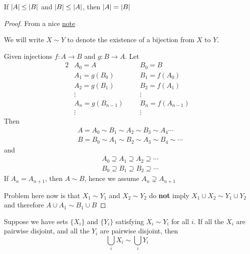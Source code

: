 \documentclass[11pt]{article}
\begin{document}
\begin{theorem}
\label{thm3.2}
If \(\abs{A}\le\abs{B}\) and \(\abs{B}\le\abs{A}\), then \(\abs{A}=\abs{B}\)
\end{theorem}

\begin{proof}
From a nice \href{https://web.williams.edu/Mathematics/lg5/CanBer.pdf}{note}

We will write \(X\sim Y\) to denote the existence of a bijection from \(X\) to \(Y\).

Given injections \(f:A\to B\) and \(g:B\to A\). Let
\begin{alignat*}{2}
&A_0=A\hspace{2cm}&&B_0=B\\
&A_1=g(B_0)&&B_1=f(A_0)\\
&A_2=g(B_1)&&B_2=f(A_1)\\
&\vdots&&\vdots\\
&A_n=g(B_{n-1})&&B_n=f(A_{n-1})\\
&\vdots&&\vdots
\end{alignat*}
Then
\begin{align*}
&A=A_0\sim B_1\sim A_2\sim B_3\sim A_4\cdots\\
&B=B_0\sim A_1\sim B_2\sim A_3\sim B_4\sim\cdots
\end{align*}
and
\begin{align*}
&A_0\supseteq A_1\supseteq A_2\supseteq\cdots\\
&B_0\supseteq B_1\supseteq B_2\supseteq\cdots
\end{align*}
If \(A_n=A_{n+1}\), then \(A\sim B\), hence we assume \(A_n\supsetneq A_{n+1}\)

Problem here now is that \(X_1\sim Y_1\) and \(X_2\sim Y_2\) do \textbf{not} imply \(X_1\cup X_2\sim Y_1\cup Y_2\) and
therefore \(A\cup A_1\sim B_1\cup B\)
\end{proof}

\begin{lemma}[]
Suppose we have sets \(\{X_i\}\) and \(\{Y_i\}\) satisfying \(X_i\sim Y_i\) for all \(i\). If all
the \(X_i\) are pairwise disjoint, and all the \(Y_i\) are pairwise disjoint, then
\begin{equation*}
\bigcup_iX_i\sim\bigcup_iY_i
\end{equation*}
\end{lemma}
\end{document}
